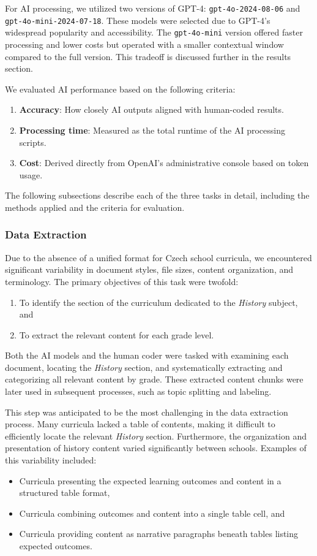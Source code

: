\documentclass[]{interact}
\theoremstyle{plain}%
\theoremstyle{definition}
\theoremstyle{remark}
\begin{document}
For AI processing, we utilized two versions of GPT-4: \texttt{gpt-4o-2024-08-06} and \texttt{gpt-4o-mini-2024-07-18}. These models were selected due to GPT-4's widespread popularity and accessibility. The \texttt{gpt-4o-mini} version offered faster processing and lower costs but operated with a smaller contextual window compared to the full version. This tradeoff is discussed further in the results section.

We evaluated AI performance based on the following criteria:  
\begin{enumerate}
    \item \textbf{Accuracy}: How closely AI outputs aligned with human-coded results.  
    \item \textbf{Processing time}: Measured as the total runtime of the AI processing scripts.  
    \item \textbf{Cost}: Derived directly from OpenAI’s administrative console based on token usage.  
\end{enumerate}

The following subsections describe each of the three tasks in detail, including the methods applied and the criteria for evaluation.

\subsubsection{Data Extraction}

Due to the absence of a unified format for Czech school curricula, we encountered significant variability in document styles, file sizes, content organization, and terminology. The primary objectives of this task were twofold:  
\begin{enumerate}
    \item To identify the section of the curriculum dedicated to the \textit{History} subject, and  
    \item To extract the relevant content for each grade level.  
\end{enumerate}

Both the AI models and the human coder were tasked with examining each document, locating the \textit{History} section, and systematically extracting and categorizing all relevant content by grade. These extracted content chunks were later used in subsequent processes, such as topic splitting and labeling.

This step was anticipated to be the most challenging in the data extraction process. Many curricula lacked a table of contents, making it difficult to efficiently locate the relevant \textit{History} section. Furthermore, the organization and presentation of history content varied significantly between schools. Examples of this variability included:  
\begin{itemize}
    \item Curricula presenting the expected learning outcomes and content in a structured table format,  
    \item Curricula combining outcomes and content into a single table cell, and  
    \item Curricula providing content as narrative paragraphs beneath tables listing expected outcomes.  
\end{itemize}
\end{document}
